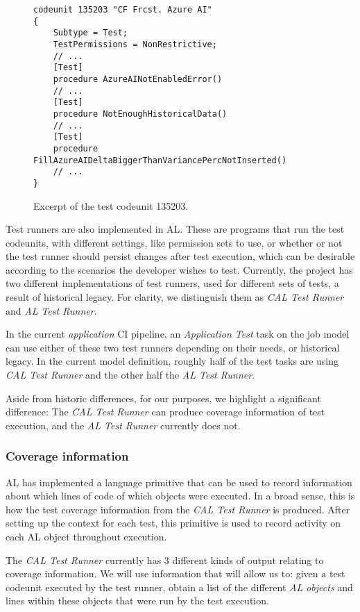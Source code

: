 \begin{figure}
    \begin{Verbatim}[fontsize=\tiny]
codeunit 135203 "CF Frcst. Azure AI"
{
    Subtype = Test;
    TestPermissions = NonRestrictive;
    // ...
    [Test]
    procedure AzureAINotEnabledError()
    // ...
    [Test]
    procedure NotEnoughHistoricalData()
    // ...
    [Test]
    procedure FillAzureAIDeltaBiggerThanVariancePercNotInserted()
    // ...
}
    \end{Verbatim}
    \caption{Excerpt of the test codeunit 135203.}
    \label{fig:bg-bc-test-codeunit}
\end{figure}

Test runners are also implemented in AL. These are programs that run the test codeunits, with different
settings, like permission sets to use, or whether or not the test runner should persist changes after 
test execution, which can be desirable according to the scenarios the developer wishes to test. Currently, 
the project has two different implementations of test runners, used for different
sets of tests, a result of historical legacy. For clarity, we distinguish them
as \emph{CAL Test Runner} and \emph{AL Test Runner}.

In the current \emph{application} CI pipeline, an \emph{Application Test} task on the job model can use either of these 
two test runners depending on their needs, or historical legacy. In the current model definition,
roughly half of the test tasks are using \emph{CAL Test Runner} and the other half the \emph{AL Test Runner}.

Aside from historic differences, for our purposes, we highlight a significant
difference: The \emph{CAL Test Runner} can produce coverage information of test execution, and the \emph{AL Test Runner}
currently does not.

\subsubsection{Coverage information}\label{s:bg-bc-coverage}
AL has implemented a language primitive that can be used to record information about which lines 
of code of which objects were executed. In a broad sense, this is how the test coverage information from 
the \emph{CAL Test Runner} is produced. After setting up the context for each test, this primitive is used
to record activity on each AL object throughout execution.

The \emph{CAL Test Runner} currently has 3 different kinds of output relating to coverage information.
We will use information that will allow us to: given a test codeunit executed by the test runner, 
obtain a list of the different \emph{AL objects} and lines within these objects that were run by
the test execution.

